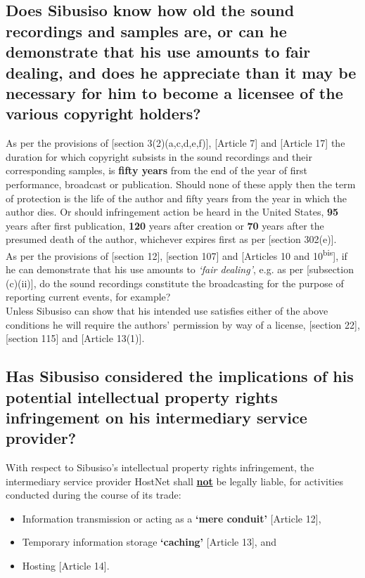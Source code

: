 \documentclass[11pt]{article}
\begin{document}
\subsection{Does Sibusiso know how old the sound recordings and samples are, or can he demonstrate that his use amounts to fair dealing, and does he appreciate than it may be necessary for him to become a licensee of the various copyright holders?}
\label{sec:orgb806403}
As per the provisions of [section 3(2)(a,c,d,e,f)]\cite{rsa78_copyrightact},
[Article 7]\cite{wipo86_berne} and [Article 17]\cite{wipo96_wppt} the duration for which copyright subsists in the
sound recordings and their corresponding samples, is \textbf{fifty years} from the end
of the year of first performance, broadcast or publication. Should none of these
apply then the term of protection is the life of the author and fifty years from
the year in which the author dies. Or should infringement action be heard in the
United States, \textbf{95} years after first publication, \textbf{120} years after creation or
\textbf{70} years after the presumed death of the author, whichever expires first as per
[section 302(e)]\cite{usa76_title17_us_copyright_act}.\\

As per the provisions of [section 12]\cite{rsa78_copyrightact}, [section
107]\cite{usa76_title17_us_copyright_act} and [Articles 10 and
10\textsuperscript{bis}]\cite{wipo86_berne}, if he can demonstrate that
his use amounts to \emph{`fair dealing'}, e.g. as per [subsection (c)(ii)], do the
sound recordings constitute the broadcasting for the purpose of reporting
current events, for example?\\

Unless Sibusiso can show that his intended use satisfies either of the above
conditions he will require the authors' permission by way of a license, [section
22]\cite{rsa78_copyrightact}, [section 115]\cite{usa76_title17_us_copyright_act} and
[Article 13(1)]\cite{wipo86_berne}.

\subsection{Has Sibusiso considered the implications of his potential intellectual property rights infringement on his intermediary service provider?}
\label{sec:orgd1e7dd0}
With respect to Sibusiso's intellectual property rights infringement, the
intermediary service provider HostNet shall \uline{\textbf{not}} be legally liable, for
activities conducted during the course of its trade:
\begin{itemize}
\item Information transmission or acting as a \textbf{`mere conduit'} [Article 12]\cite{eurlex00_elec_commerce},
\item Temporary information storage \textbf{`caching'} [Article 13]\cite{eurlex00_elec_commerce}, and
\item Hosting [Article 14]\cite{eurlex00_elec_commerce}.
\end{itemize}
\end{document}
